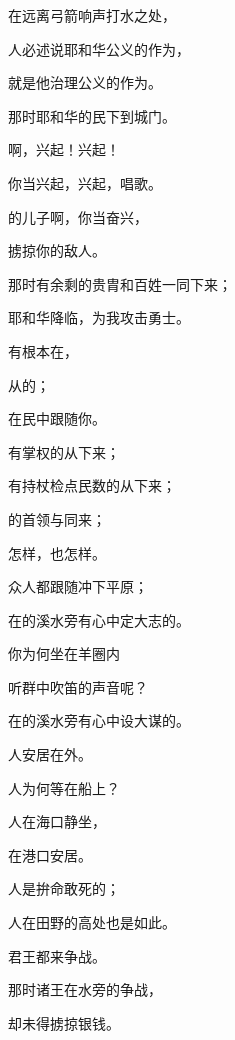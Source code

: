 {\par }{\Q {}在远离弓箭响声打水之处，
\par }{\Q 人必述说耶和华公义的作为，
\par }{\Q 就是他治理{}公义的作为。
\par }{\Q 那时耶和华的民下到城门。
\par }{\BB \par }{\Q {}啊，兴起！兴起！
\par }{\Q 你当兴起，兴起，唱歌。
\par }{的儿子{}啊，你当奋兴，
\par }{\Q 掳掠你的敌人。
\par }{\Q {}那时有余剩的贵胄和百姓一同下来；
\par }{\Q 耶和华降临，为我攻击勇士。
\par }{\Q {}有根本在{}{}，
\par }{\Q 从{}{}的；
\par }{在民中跟随你。
\par }{\Q 有掌权的从{}下来；
\par }{\Q 有持杖检点民数的从{}下来；
\par }{\Q {}的首领与{}同来；
\par }{怎样，{}也怎样。
\par }{\Q 众人都跟随{}冲下平原；
\par }{\Q 在{}的溪水旁有心中定大志的。
\par }{\Q {}你为何坐在羊圈内
\par }{\Q 听群中吹笛的声音呢？
\par }{\Q 在{}的溪水旁有心中设大谋的。
\par }{\Q {}人安居在{}外。
\par }{人为何等在船上？
\par }{人在海口静坐，
\par }{\Q 在港口安居。
\par }{\Q {}人是拚命敢死的；
\par }{人在田野的高处也是如此。
\par }{\BB \par }{\Q {}君王都来争战。
\par }{\Q 那时{}诸王在{}水旁的{}争战，
\par }{\Q 却未得掳掠银钱。
}
